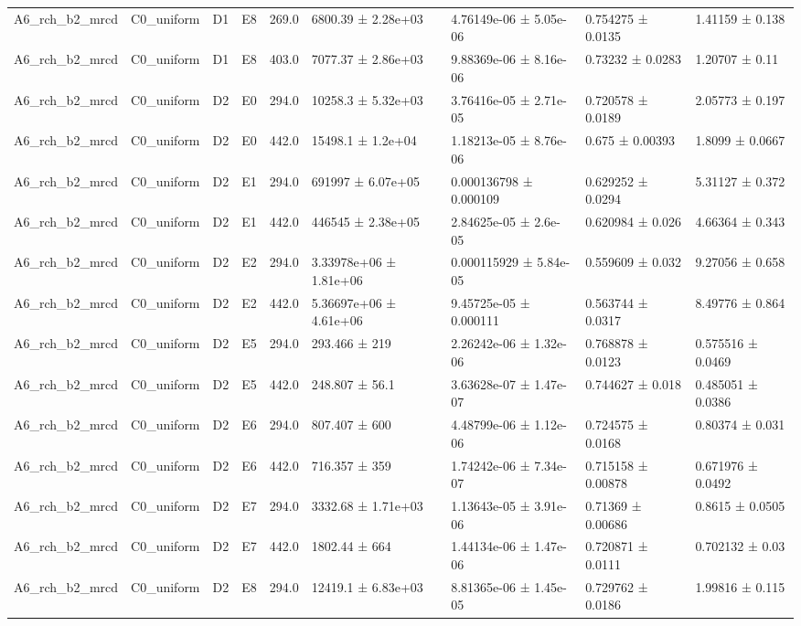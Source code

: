 \begin{table}
\begin{tabular}{lllllllll}
A6\_rch\_b2\_mrcd & C0\_uniform & D1 & E8 & 269.0 & 6800.39 ± 2.28e+03 & 4.76149e-06 ± 5.05e-06 & 0.754275 ± 0.0135 & 1.41159 ± 0.138 \\
A6\_rch\_b2\_mrcd & C0\_uniform & D1 & E8 & 403.0 & 7077.37 ± 2.86e+03 & 9.88369e-06 ± 8.16e-06 & 0.73232 ± 0.0283 & 1.20707 ± 0.11 \\
A6\_rch\_b2\_mrcd & C0\_uniform & D2 & E0 & 294.0 & 10258.3 ± 5.32e+03 & 3.76416e-05 ± 2.71e-05 & 0.720578 ± 0.0189 & 2.05773 ± 0.197 \\
A6\_rch\_b2\_mrcd & C0\_uniform & D2 & E0 & 442.0 & 15498.1 ± 1.2e+04 & 1.18213e-05 ± 8.76e-06 & 0.675 ± 0.00393 & 1.8099 ± 0.0667 \\
A6\_rch\_b2\_mrcd & C0\_uniform & D2 & E1 & 294.0 & 691997 ± 6.07e+05 & 0.000136798 ± 0.000109 & 0.629252 ± 0.0294 & 5.31127 ± 0.372 \\
A6\_rch\_b2\_mrcd & C0\_uniform & D2 & E1 & 442.0 & 446545 ± 2.38e+05 & 2.84625e-05 ± 2.6e-05 & 0.620984 ± 0.026 & 4.66364 ± 0.343 \\
A6\_rch\_b2\_mrcd & C0\_uniform & D2 & E2 & 294.0 & 3.33978e+06 ± 1.81e+06 & 0.000115929 ± 5.84e-05 & 0.559609 ± 0.032 & 9.27056 ± 0.658 \\
A6\_rch\_b2\_mrcd & C0\_uniform & D2 & E2 & 442.0 & 5.36697e+06 ± 4.61e+06 & 9.45725e-05 ± 0.000111 & 0.563744 ± 0.0317 & 8.49776 ± 0.864 \\
A6\_rch\_b2\_mrcd & C0\_uniform & D2 & E5 & 294.0 & 293.466 ± 219 & 2.26242e-06 ± 1.32e-06 & 0.768878 ± 0.0123 & 0.575516 ± 0.0469 \\
A6\_rch\_b2\_mrcd & C0\_uniform & D2 & E5 & 442.0 & 248.807 ± 56.1 & 3.63628e-07 ± 1.47e-07 & 0.744627 ± 0.018 & 0.485051 ± 0.0386 \\
A6\_rch\_b2\_mrcd & C0\_uniform & D2 & E6 & 294.0 & 807.407 ± 600 & 4.48799e-06 ± 1.12e-06 & 0.724575 ± 0.0168 & 0.80374 ± 0.031 \\
A6\_rch\_b2\_mrcd & C0\_uniform & D2 & E6 & 442.0 & 716.357 ± 359 & 1.74242e-06 ± 7.34e-07 & 0.715158 ± 0.00878 & 0.671976 ± 0.0492 \\
A6\_rch\_b2\_mrcd & C0\_uniform & D2 & E7 & 294.0 & 3332.68 ± 1.71e+03 & 1.13643e-05 ± 3.91e-06 & 0.71369 ± 0.00686 & 0.8615 ± 0.0505 \\
A6\_rch\_b2\_mrcd & C0\_uniform & D2 & E7 & 442.0 & 1802.44 ± 664 & 1.44134e-06 ± 1.47e-06 & 0.720871 ± 0.0111 & 0.702132 ± 0.03 \\
A6\_rch\_b2\_mrcd & C0\_uniform & D2 & E8 & 294.0 & 12419.1 ± 6.83e+03 & 8.81365e-06 ± 1.45e-05 & 0.729762 ± 0.0186 & 1.99816 ± 0.115 \\

\end{tabular}
\end{table}
